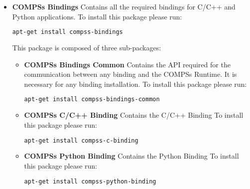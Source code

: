 \begin{itemize}
 \item \textbf{COMPSs Bindings} \newline
       Contains all the required bindings for C/C++ and Python applications. 
       \newline
       To install this package please run:
       \begin{lstlisting}[language=bash]
	  apt-get install compss-bindings
       \end{lstlisting}
       This package is composed of three sub-packages:
       \begin{itemize}
        \item \textbf{COMPSs Bindings Common} \newline
	      Contains the API required for the communication between any binding and the COMPSs Runtime. It is necessary for any binding installation.
	      \newline
	      To install this package please run:
	      \begin{lstlisting}[language=bash]
		  apt-get install compss-bindings-common
	      \end{lstlisting}
        \item \textbf{COMPSs C/C++ Binding} \newline
	      Contains the C/C++ Binding
	      \newline
	      To install this package please run:
	      \begin{lstlisting}[language=bash]
		  apt-get install compss-c-binding
	      \end{lstlisting}
        \item \textbf{COMPSs Python Binding} \newline
	      Contains the Python Binding
	      \newline
	      To install this package please run:
	      \begin{lstlisting}[language=bash]
		  apt-get install compss-python-binding
	      \end{lstlisting}
       \end{itemize}


\end{itemize}
